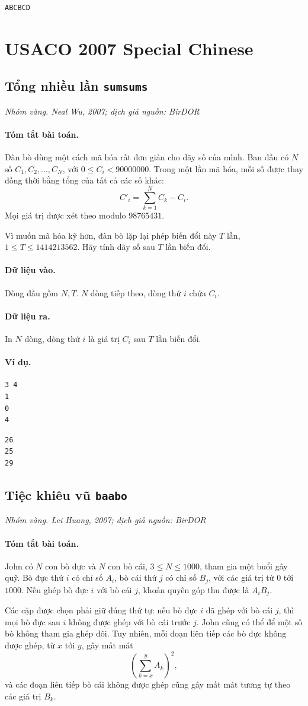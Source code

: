 \documentclass[11pt]{article}
\newcommand{\problem}[4]{%
  \subsection[#1 (#2)]{#1 \hfill {\normalsize\texttt{#2}}}%
  \noindent\textit{#3. #4}\par\smallskip
}
\newcommand{\iosec}[1]{\paragraph{#1}}
\begin{document}
\begin{verbatim}
ABCBCD
\end{verbatim}

\section{USACO 2007 Special Chinese}

\problem{Tổng nhiều lần}{sumsums}{Nhóm vàng}{Neal Wu, 2007; dịch giả nguồn: BirDOR}

\iosec{Tóm tắt bài toán.}
Đàn bò dùng một cách mã hóa rất đơn giản cho dãy số của mình. Ban đầu có
\(N\) số \(C_1,C_2,\ldots,C_N\), với \(0\le C_i<90000000\). Trong một lần
mã hóa, mỗi số được thay đồng thời bằng tổng của tất cả các số khác:
\[
  C'_i=\sum_{k=1}^{N} C_k-C_i.
\]
Mọi giá trị được xét theo modulo \(98765431\).

Vì muốn mã hóa kỹ hơn, đàn bò lặp lại phép biến đổi này \(T\) lần,
\(1\le T\le 1414213562\). Hãy tính dãy số sau \(T\) lần biến đổi.

\iosec{Dữ liệu vào.}
Dòng đầu gồm \(N,T\). \(N\) dòng tiếp theo, dòng thứ \(i\) chứa \(C_i\).

\iosec{Dữ liệu ra.}
In \(N\) dòng, dòng thứ \(i\) là giá trị \(C_i\) sau \(T\) lần biến đổi.

\iosec{Ví dụ.}
\begin{verbatim}
3 4
1
0
4
\end{verbatim}

\begin{verbatim}
26
25
29
\end{verbatim}

\problem{Tiệc khiêu vũ}{baabo}{Nhóm vàng}{Lei Huang, 2007; dịch giả nguồn: BirDOR}

\iosec{Tóm tắt bài toán.}
John có \(N\) con bò đực và \(N\) con bò cái,
\(3\le N\le 1000\), tham gia một buổi gây quỹ. Bò đực thứ \(i\) có chỉ số
\(A_i\), bò cái thứ \(j\) có chỉ số \(B_j\), với các giá trị từ \(0\) tới
\(1000\). Nếu ghép bò đực \(i\) với bò cái \(j\), khoản quyên góp thu được là
\(A_iB_j\).

Các cặp được chọn phải giữ đúng thứ tự: nếu bò đực \(i\) đã ghép với bò cái
\(j\), thì mọi bò đực sau \(i\) không được ghép với bò cái trước \(j\). John
cũng có thể để một số bò không tham gia ghép đôi. Tuy nhiên, mỗi đoạn liên
tiếp các bò đực không được ghép, từ \(x\) tới \(y\), gây mất mát
\[
  \left(\sum_{k=x}^{y} A_k\right)^2,
\]
và các đoạn liên tiếp bò cái không được ghép cũng gây mất mát tương tự theo
các giá trị \(B_k\).
\end{document}
